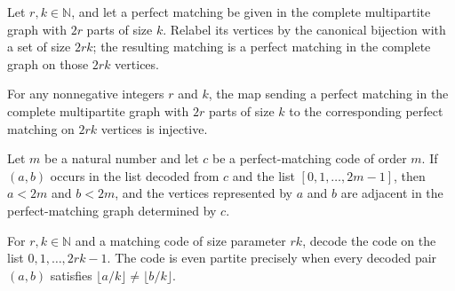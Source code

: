 \begin{definition}
\label{FABL.graphPartiteMatchingToCompletePerfectMatching}
\leanok
{}
Let $r,k\in\mathbb{N}$, and let a perfect matching be given in the complete multipartite
graph with $2r$ parts of size $k$. Relabel its vertices by the canonical bijection with
a set of size $2rk$; the resulting matching is a perfect matching in the complete graph
on those $2rk$ vertices.
\end{definition}

\begin{theorem}
\label{FABL.graphPartiteMatchingToCompletePerfectMatching_injective}
\leanok
{}
For any nonnegative integers $r$ and $k$, the map sending a perfect matching in the
complete multipartite graph with $2r$ parts of size $k$ to the corresponding perfect
matching on $2rk$ vertices is injective.
\end{theorem}

\begin{theorem}
\label{FABL.decodedRangeEdge_perfectMatchingGraph_adj}
\leanok
{}
Let $m$ be a natural number and let $c$ be a perfect-matching code of order $m$. If
$(a,b)$ occurs in the list decoded from $c$ and the list $[0,1,\ldots,2m-1]$, then
$a<2m$ and $b<2m$, and the vertices represented by $a$ and $b$ are adjacent in the
perfect-matching graph determined by $c$.
\end{theorem}

\begin{definition}
\label{FABL.IsEvenPartitePerfectMatchingCode}
\leanok
{}
For $r,k\in\mathbb{N}$ and a matching code of size parameter $rk$, decode the code on
the list $0,1,\ldots,2rk-1$. The code is even partite precisely when every decoded pair
$(a,b)$ satisfies $\lfloor a/k\rfloor\ne\lfloor b/k\rfloor$.
\end{definition}

